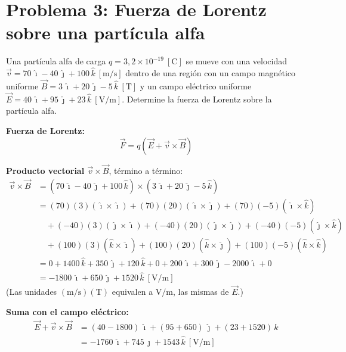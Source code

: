 \documentclass[12pt,letterpaper]{article}
\begin{document}
\vspace{0.6cm}

\section*{Problema 3: Fuerza de Lorentz sobre una part\'icula alfa}

\noindent Una part\'icula alfa de carga $q = 3{,}2\times10^{-19}\ [\text{C}]$ se mueve con una
velocidad $\vec{v} = 70\,\hat{\imath} - 40\,\hat{\jmath} + 100\,\hat{k}\ [\text{m/s}]$ dentro de una
regi\'on con un campo magn\'etico uniforme $\vec{B} = 3\,\hat{\imath} + 20\,\hat{\jmath} - 5\,\hat{k}\
[\text{T}]$ y un campo el\'ectrico uniforme
$\vec{E} = 40\,\hat{\imath} + 95\,\hat{\jmath} + 23\,\hat{k}\ [\text{V/m}]$. Determine la fuerza de
Lorentz sobre la part\'icula alfa.

\medskip
\noindent\textbf{Fuerza de Lorentz:}
\[
    \vec{F} = q\left(\vec{E} + \vec{v}\times\vec{B}\right)
\]

\noindent\textbf{Producto vectorial $\vec{v}\times\vec{B}$}, t\'ermino a t\'ermino:
\begin{align*}
    \vec{v}\times\vec{B} &= \left(70\,\hat{\imath} - 40\,\hat{\jmath} + 100\,\hat{k}\right)\times
                            \left(3\,\hat{\imath} + 20\,\hat{\jmath} - 5\,\hat{k}\right)\\[4pt]
    &= (70)(3)(\hat{\imath}\times\hat{\imath}) + (70)(20)(\hat{\imath}\times\hat{\jmath})
       + (70)(-5)(\hat{\imath}\times\hat{k})\\
    &\quad + (-40)(3)(\hat{\jmath}\times\hat{\imath}) + (-40)(20)(\hat{\jmath}\times\hat{\jmath})
       + (-40)(-5)(\hat{\jmath}\times\hat{k})\\
    &\quad + (100)(3)(\hat{k}\times\hat{\imath}) + (100)(20)(\hat{k}\times\hat{\jmath})
       + (100)(-5)(\hat{k}\times\hat{k})\\[4pt]
    &= 0 + 1400\,\hat{k} + 350\,\hat{\jmath} + 120\,\hat{k} + 0 + 200\,\hat{\imath}
       + 300\,\hat{\jmath} - 2000\,\hat{\imath} + 0\\[4pt]
    &= -1800\,\hat{\imath} + 650\,\hat{\jmath} + 1520\,\hat{k}\ [\text{V/m}]
\end{align*}
(Las unidades $(\text{m/s})(\text{T})$ equivalen a $\text{V/m}$, las mismas de $\vec{E}$.)

\medskip
\noindent\textbf{Suma con el campo el\'ectrico:}
\begin{align*}
    \vec{E} + \vec{v}\times\vec{B} &= (40 - 1800)\,\hat{\imath} + (95 + 650)\,\hat{\jmath}
                                      + (23 + 1520)\,\hat{k}\\[2pt]
                                   &= -1760\,\hat{\imath} + 745\,\hat{\jmath} + 1543\,\hat{k}\ [\text{V/m}]
\end{align*}
\end{document}
